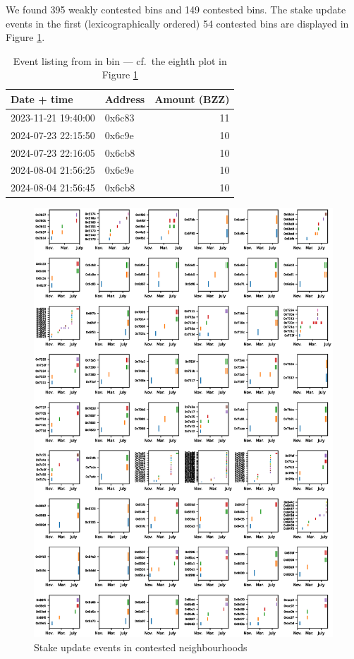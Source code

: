 We found 395 weakly contested bins and 149 contested bins. 
%
The stake update events in the first (lexicographically ordered) 54 contested bins are displayed in Figure \ref{event-plot}.
%
\begin{table}
  \begin{center}
\begin{tabular}{llr}
Date + time         & Address & Amount (BZZ) \\
\hline
2023-11-21 19:40:00 & 0x6c83 &   11 \\
2024-07-23 22:15:50 &	0x6c9e  &	10 \\
2024-07-23 22:16:05 &	0x6cb8  &	10 \\
2024-08-04 21:56:25 &	0x6c9e  &	10 \\
2024-08-04 21:56:45 &	0x6cb8  &	10
\end{tabular}
\caption{Event listing from in bin  --- cf.~the eighth plot in Figure \ref{event-plot}}
\label{event-listing}
\end{center}
\end{table}
%
  \begin{figure}[p]
\begin{center}
    \includegraphics[width=\textwidth]{common/contested.eps}
    \caption{Stake update events in contested neighbourhoods}
    \label{event-plot}

  \end{center}
  \end{figure}
